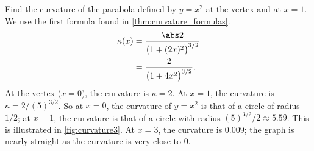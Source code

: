 
\begin{example}\label{ex_curvature3}
Find the curvature of the parabola defined by $y=x^2$ at the vertex and at $x=1$.
\solution
We use the first formula found in \autoref{thm:curvature_formulas}. 
\begin{align*}
\kappa(x) &= \frac{\abs 2}{\big(1+(2x)^2\big)^{3/2}} \\
			&= \frac2{\big(1+4x^2\big)^{3/2}}.
\end{align*}
At the vertex ($x=0$), the curvature is $\kappa = 2$. At $x=1$, the curvature is $\kappa = 2/(5)^{3/2}$. So at $x=0$, the curvature of $y=x^2$ is that of a circle of radius $1/2$; at $x=1$, the curvature is that of a circle with radius $(5)^{3/2}/2\approx 5.59$. This is illustrated in \autoref{fig:curvature3}. At $x=3$, the curvature is $0.009$; the graph is nearly straight as the curvature is very close to 0.
\end{example}


